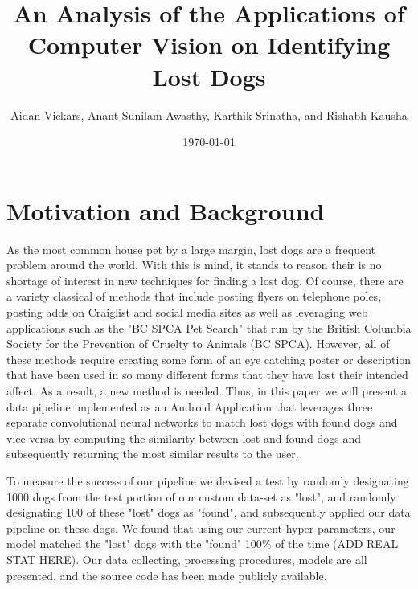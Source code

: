 \documentclass{article}
\title{An Analysis of the Applications of Computer Vision on Identifying Lost Dogs}
\author{Aidan Vickars, Anant Sunilam Awasthy, Karthik Srinatha, and Rishabh Kausha}
\date{\today}
\begin{document}
\maketitle

\newpage
\section{Motivation and Background}
As the most common house pet by a large margin, lost dogs are a frequent problem around the world.  With this is mind, it stands to reason their is no shortage of interest in new techniques for finding a lost dog.  Of course, there are a variety classical of methods that include posting flyers on telephone poles, posting adds on Craiglist and social media sites as well as leveraging web applications such as the "BC SPCA Pet Search" that run by the British Columbia Society for the Prevention of Cruelty to Animals (BC SPCA).  However, all of these methods require creating some form of an eye catching poster or description that have been used in so many different forms that they have lost their intended affect.  As a result, a new method is needed.  Thus, in this paper we will present a data pipeline implemented as an Android Application that leverages three separate convolutional neural networks to match lost dogs with found dogs and vice versa by computing the similarity between lost and found dogs and subsequently returning the most similar results to the user.

To measure the success of our pipeline we devised a test by randomly designating 1000 dogs from the test portion of our custom data-set as "lost", and randomly designating 100 of these "lost" dogs as "found", and subsequently applied our data pipeline on these dogs.  We found that using our current hyper-parameters, our model matched the "lost" dogs with the "found" 100\% of the time (ADD REAL STAT HERE).  Our data collecting, processing procedures, models are all presented, and the source code has been made publicly available.
\end{document}
